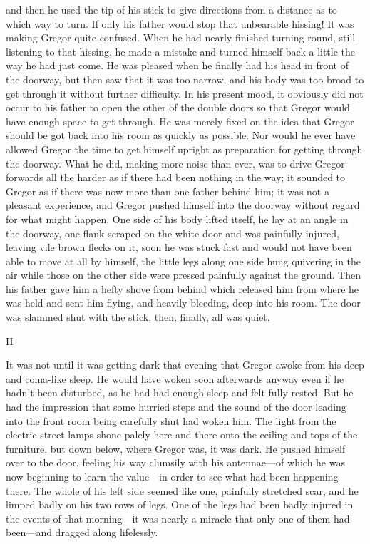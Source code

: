 and then he used the tip of his stick to give directions from a
distance as to which way to turn. If only his father would stop that
unbearable hissing! It was making Gregor quite confused. When he had
nearly finished turning round, still listening to that hissing, he made
a mistake and turned himself back a little the way he had just come. He
was pleased when he finally had his head in front of the doorway, but
then saw that it was too narrow, and his body was too broad to get
through it without further difficulty. In his present mood, it
obviously did not occur to his father to open the other of the double
doors so that Gregor would have enough space to get through. He was
merely fixed on the idea that Gregor should be got back into his room
as quickly as possible. Nor would he ever have allowed Gregor the time
to get himself upright as preparation for getting through the doorway.
What he did, making more noise than ever, was to drive Gregor forwards
all the harder as if there had been nothing in the way; it sounded to
Gregor as if there was now more than one father behind him; it was not
a pleasant experience, and Gregor pushed himself into the doorway
without regard for what might happen. One side of his body lifted
itself, he lay at an angle in the doorway, one flank scraped on the
white door and was painfully injured, leaving vile brown flecks on it,
soon he was stuck fast and would not have been able to move at all by
himself, the little legs along one side hung quivering in the air while
those on the other side were pressed painfully against the ground. Then
his father gave him a hefty shove from behind which released him from
where he was held and sent him flying, and heavily bleeding, deep into
his room. The door was slammed shut with the stick, then, finally, all
was quiet.




II


It was not until it was getting dark that evening that Gregor awoke
from his deep and coma-like sleep. He would have woken soon afterwards
anyway even if he hadn’t been disturbed, as he had had enough sleep and
felt fully rested. But he had the impression that some hurried steps
and the sound of the door leading into the front room being carefully
shut had woken him. The light from the electric street lamps shone
palely here and there onto the ceiling and tops of the furniture, but
down below, where Gregor was, it was dark. He pushed himself over to
the door, feeling his way clumsily with his antennae—of which he was
now beginning to learn the value—in order to see what had been
happening there. The whole of his left side seemed like one, painfully
stretched scar, and he limped badly on his two rows of legs. One of the
legs had been badly injured in the events of that morning—it was nearly
a miracle that only one of them had been—and dragged along lifelessly.

